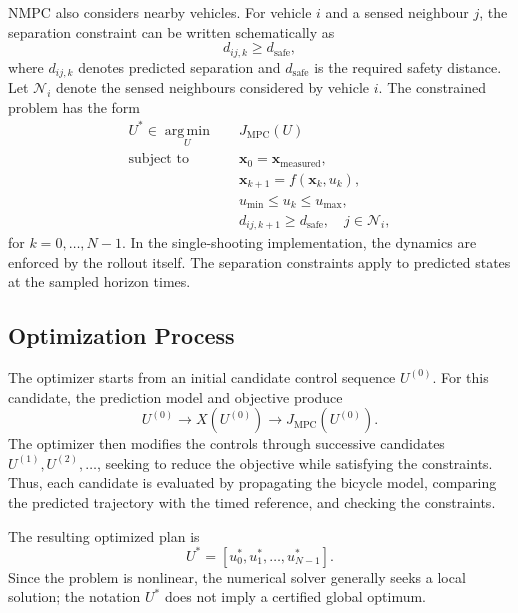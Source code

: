 \documentclass[letterpaper,10pt,conference]{ieeeconf}
\begin{document}
NMPC also considers nearby vehicles. For vehicle $i$ and a sensed neighbour
$j$, the separation constraint can be written schematically as
\begin{equation}
    d_{ij,k}\geq d_{\mathrm{safe}},
\end{equation}
where $d_{ij,k}$ denotes predicted separation and $d_{\mathrm{safe}}$ is the
required safety distance. Let $\mathcal{N}_i$ denote the sensed neighbours
considered by vehicle $i$. The constrained problem has the form
\begin{equation}
\begin{aligned}
    U^*\in\operatorname*{arg\,min}_{U}\quad
        &J_{\mathrm{MPC}}(U)\\
    \text{subject to}\quad
        &\mathbf{x}_0=\mathbf{x}_{\mathrm{measured}},\\
        &\mathbf{x}_{k+1}=f(\mathbf{x}_k,u_k),\\
        &u_{\min}\leq u_k\leq u_{\max},\\
        &d_{ij,k+1}\geq d_{\mathrm{safe}},\quad j\in\mathcal{N}_i,
\end{aligned}
    \label{eq:mpc-problem}
\end{equation}
for $k=0,\ldots,N-1$. In the single-shooting implementation, the dynamics
are enforced by the rollout itself. The separation constraints apply to
predicted states at the sampled horizon times.

\subsection{Optimization Process}

The optimizer starts from an initial candidate control sequence $U^{(0)}$.
For this candidate, the prediction model and objective produce
\begin{equation}
    U^{(0)}\rightarrow X(U^{(0)})\rightarrow J_{\mathrm{MPC}}(U^{(0)}).
\end{equation}
The optimizer then modifies the controls through successive candidates
$U^{(1)},U^{(2)},\ldots$, seeking to reduce the objective while satisfying
the constraints. Thus, each candidate is evaluated by propagating the bicycle
model, comparing the predicted trajectory with the timed reference, and
checking the constraints.

The resulting optimized plan is
\begin{equation}
    U^*=[u_0^*,u_1^*,\ldots,u_{N-1}^*].
\end{equation}
Since the problem is nonlinear, the numerical solver generally seeks a local
solution; the notation $U^*$ does not imply a certified global optimum.
\end{document}
